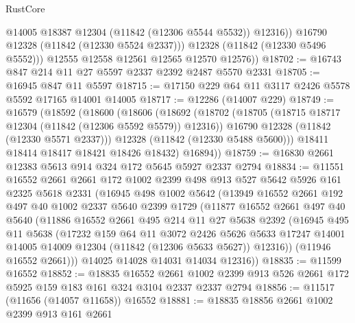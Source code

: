 \begin{lexlean}{RustCore}
\begin{coremodule}
                @14005
                @18387
                @12304
                (@11842 (@12306 @5544 @5532))
                @12316))
            @16790
            @12328
            (@11842 (@12330 @5524 @2337)))
          @12328
          (@11842 (@12330 @5496 @5552)))
        @12555
        @12558
        @12561
        @12565
        @12570
        @12576))
@18702 := @16743 @847 @214 @11 @27 @5597 @2337 @2392 @2487 @5570 @2331
@18705 := @16945 @847 @11 @5597
@18715 := @17150 @229 @64 @11 @3117 @2426 @5578 @5592 @17165 @14001 @14005
@18717 := @12286 (@14007 @229)
@18749 := @16579
    (@18592
      (@18600
        (@18606
          (@18692
            (@18702
              (@18705 (@18715 @18717 @12304 (@11842 (@12306 @5592 @5579)) @12316))
              @16790
              @12328
              (@11842 (@12330 @5571 @2337)))
            @12328
            (@11842 (@12330 @5488 @5600)))
          @18411
          @18414
          @18417
          @18421
          @18426
          @18432)
        @16894))
@18759 := @16830 @2661 @12383 @5613 @914 @324 @172 @5645 @5927 @2337 @2794
@18834 := @11551
    @16552
    @2661
    @2661
    @172
    @1002
    @2399
    @498
    @913
    @527
    @5642
    @5926
    @161
    @2325
    @5618
    @2331
    (@16945
      @498
      @1002
      @5642
      (@13949
        @16552
        @2661
        @192
        @497
        @40
        @1002
        @2337
        @5640
        @2399
        @1729
        (@11877
          @16552
          @2661
          @497
          @40
          @5640
          (@11886
            @16552
            @2661
            @495
            @214
            @11
            @27
            @5638
            @2392
            (@16945
              @495
              @11
              @5638
              (@17232
                @159
                @64
                @11
                @3072
                @2426
                @5626
                @5633
                @17247
                @14001
                @14005
                @14009
                @12304
                (@11842 (@12306 @5633 @5627))
                @12316))
            (@11946 @16552 @2661)))
        @14025
        @14028
        @14031
        @14034
        @12316))
@18835 := @11599 @16552
@18852 := @18835
    @16552
    @2661
    @1002
    @2399
    @913
    @526
    @2661
    @172
    @5925
    @159
    @183
    @161
    @324
    @3104
    @2337
    @2337
    @2794
@18856 := @11517 (@11656 (@14057 @11658)) @16552
@18881 := @18835
    @18856
    @2661
    @1002
    @2399
    @913
    @161
    @2661

\end{coremodule}
\end{lexlean}
